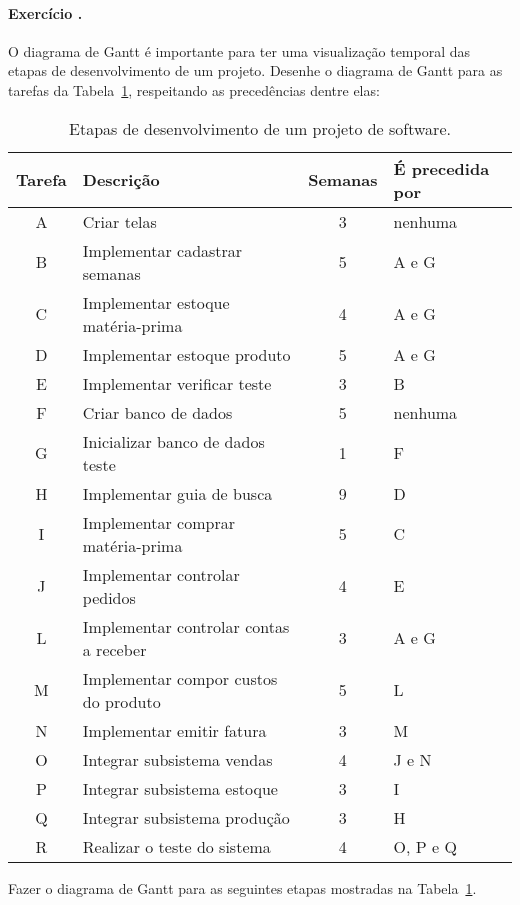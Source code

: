 
\paragraph{Exercício \exno.} O diagrama de Gantt é importante para ter uma
visualização temporal das etapas de desenvolvimento de um
projeto. Desenhe o diagrama de Gantt para as tarefas da Tabela~\ref{tab:tasks},
respeitando as precedências dentre elas:

\begin{table}[ht]
\begin{center}
\bigskip\begingroup\small
\begin{tabular}{c|l|c|l}\hline
\bf Tarefa & \bf\hfil Descrição & \bf Semanas & \bf É precedida por \\\hline\hline
A & Criar telas & 3 & nenhuma\\
B & Implementar cadastrar semanas & 5 & A e G \\
C & Implementar estoque matéria-prima & 4 & A e G \\
D & Implementar estoque produto & 5 & A e G \\
E & Implementar verificar teste & 3 & B\\
F & Criar banco de dados & 5 & nenhuma \\
G & Inicializar banco de dados teste & 1 & F \\
H & Implementar guia de busca & 9 & D \\
I & Implementar comprar matéria-prima & 5 & C \\
J & Implementar controlar pedidos & 4 & E \\
L & Implementar controlar contas a receber & 3 & A e G \\
M & Implementar compor custos do produto & 5 & L \\
N & Implementar emitir fatura & 3 & M \\
O & Integrar subsistema vendas & 4 & J e N \\
P & Integrar subsistema estoque & 3 & I \\
Q & Integrar subsistema produção & 3 & H \\
R & Realizar o teste do sistema & 4 & O, P e Q \\\hline
\end{tabular}
\caption{Etapas de desenvolvimento de um projeto de software.}
\label{tab:tasks}
\endgroup
\end{center}
\end{table}


 Fazer o diagrama de Gantt para as seguintes etapas
mostradas na Tabela~\ref{tab:tasks}.


